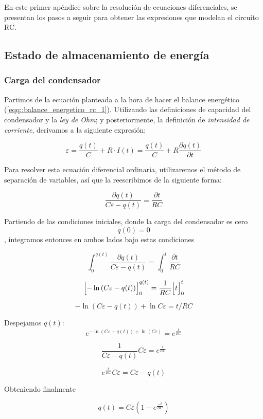 \documentclass[../main.tex]{subfiles}
\begin{document}
En este primer apéndice sobre la resolución de ecuaciones diferenciales, se presentan los pasos a seguir para obtener las expresiones que modelan el circuito RC. \\

\subsection{Estado de almacenamiento de energía}
\subsubsection{Carga del condensador}
\label{part::carga_condensador_1}
Partimos de la ecuación planteada a la hora de hacer el balance energético (\ref{eqq::balance_energetico_rc_1}). Utilizando las definiciones de capacidad del condensador y la \textit{ley de Ohm}; y posteriormente, la definición de \textit{intensidad de corriente}, derivamos a la siguiente expresión:

$$\varepsilon = \frac{q(t)}{C} + R\cdot I(t) = \frac{q(t)}{C} + R \frac{\partial q(t)}{\partial t}$$

Para resolver esta ecuación diferencial ordinaria, utilizaremos el método de separación de variables, así que la reescribimos de la siguiente forma:

$$\frac{\partial q(t)}{C\varepsilon - q(t)} = \frac{\partial t}{RC}$$

Partiendo de las condiciones iniciales, donde la carga del condensador es cero 
$$q(0) = 0$$, integramos entonces en ambos lados bajo estas condiciones

$$\int_{0}^{q(t)} \frac{\partial q(t)}{C\varepsilon - q(t)}  =  \int_{0}^{t} \frac{\partial t}{RC} $$

$$\Bigl[ -\ln{\left( C\varepsilon - q(t) \right)} \Bigr]_{0}^{q(t)} = \frac{1}{RC}\Bigl[  t\Bigr]_0^{t}$$

$$ -\ln{\left( C\varepsilon - q(t)\right)} + \ln C\varepsilon = t/{RC}$$

Despejamos $q(t)$:
{\large
$$ e^{-\ln{\left( C\varepsilon - q(t)\right)} + \ln{\left( C\varepsilon \right)}} = e^{\frac{t}{RC}}$$ }

$$\frac{1}{C\varepsilon - q(t)}C\varepsilon = e^{\frac{t}{RC}}$$

$$e^{\frac{t}{RC}} C  \varepsilon = C\varepsilon - q(t)$$

Obteniendo finalmente

\begin{equation}
    q(t) = C\varepsilon \left( 1 - e^{\frac{-t}{RC}} \right)
    \label{eqq:q(t)_carga_rc}
\end{equation}
\end{document}
